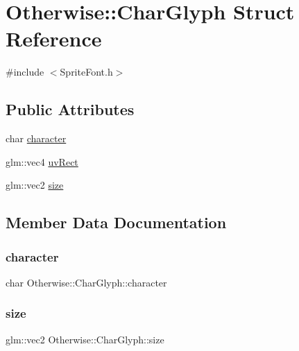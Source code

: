 \hypertarget{struct_otherwise_1_1_char_glyph}{}\section{Otherwise\+:\+:Char\+Glyph Struct Reference}
\label{struct_otherwise_1_1_char_glyph}


{\ttfamily \#include $<$Sprite\+Font.\+h$>$}

\subsection*{Public Attributes}
\begin{DoxyCompactItemize}
\item 
char \hyperlink{struct_otherwise_1_1_char_glyph_a25938e3acfdf387a20577ab90abe22c2}{character}
\item 
glm\+::vec4 \hyperlink{struct_otherwise_1_1_char_glyph_ada3858aad815179db054b96380c0110d}{uv\+Rect}
\item 
glm\+::vec2 \hyperlink{struct_otherwise_1_1_char_glyph_a4a10d75573d8831291277fe42cf9a81e}{size}
\end{DoxyCompactItemize}


\subsection{Member Data Documentation}
\mbox{\label{struct_otherwise_1_1_char_glyph_a25938e3acfdf387a20577ab90abe22c2}} 
\subsubsection{\texorpdfstring{character}{character}}
{\footnotesize\ttfamily char Otherwise\+::\+Char\+Glyph\+::character}

\mbox{\label{struct_otherwise_1_1_char_glyph_a4a10d75573d8831291277fe42cf9a81e}} 
\subsubsection{\texorpdfstring{size}{size}}
{\footnotesize\ttfamily glm\+::vec2 Otherwise\+::\+Char\+Glyph\+::size}

